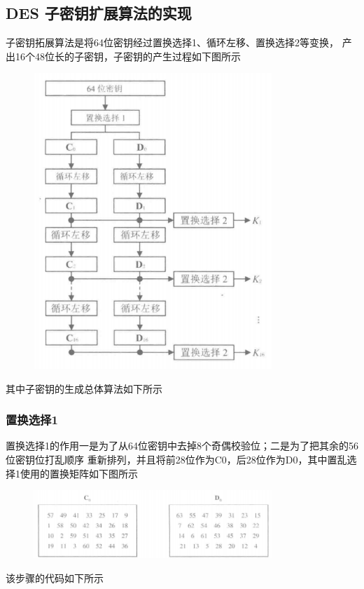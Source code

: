 \documentclass[a4paper,11pt,UTF8]{ctexart}
\newcommand{\bottomcaption}{%
\setlength{\abovecaptionskip}{6pt}%
\setlength{\belowcaptionskip}{6pt}%
\caption}
\newcommand{\xiaowuhao}{\fontsize{9pt}{\baselineskip}\selectfont}   %
\begin{document}
    \subsection{DES 子密钥扩展算法的实现}
        子密钥拓展算法是将64位密钥经过置换选择1、循环左移、置换选择2等变换，
        产出16个48位长的子密钥，子密钥的产生过程如下图所示
        \begin{figure}[H]
            \centering
            \includegraphics[width=9cm]{get_keys.png}
            \bottomcaption{\xiaowuhao{子密钥的产生}}
        \end{figure}
        其中子密钥的生成总体算法如下所示
        
\newpage
        \subsubsection{置换选择1}
            置换选择1的作用一是为了从64位密钥中去掉8个奇偶校验位；二是为了把其余的56位密钥位打乱顺序
            重新排列，并且将前28位作为C0，后28位作为D0，其中置乱选择1使用的置换矩阵如下图所示
            \begin{figure}[H]
                \centering
                \includegraphics[width=9cm]{PC_1.png}
                \bottomcaption{\xiaowuhao{置换选择1矩阵}}
            \end{figure}
            该步骤的代码如下所示
            
\newpage
\end{document}
